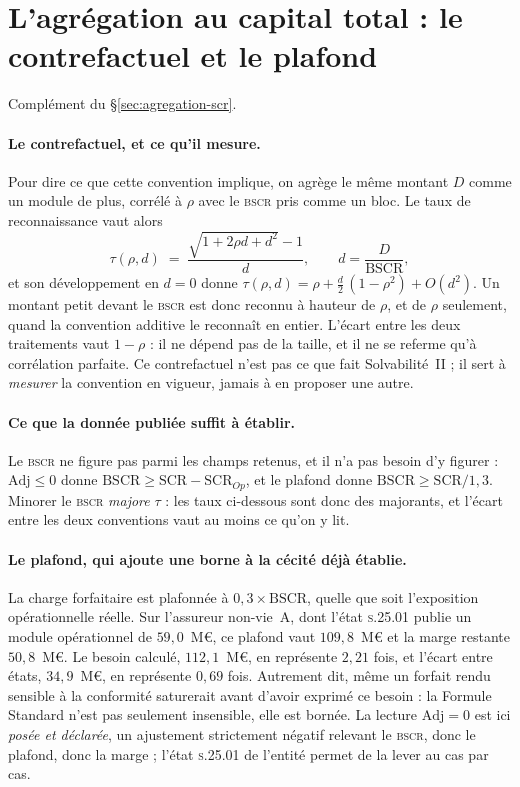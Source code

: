 \section{L'agrégation au capital total : le contrefactuel et le plafond}
\label{sec:ann-agregation}


Complément du \S\ref{sec:agregation-scr}.

\paragraph{Le contrefactuel, et ce qu'il mesure.} Pour dire ce que cette convention implique, on
agrège le même montant $D$ comme un module de plus, corrélé à $\rho$ avec le \textsc{bscr} pris
comme un bloc. Le taux de reconnaissance vaut alors
\[
  \tau(\rho, d) \;=\; \frac{\sqrt{1 + 2\rho d + d^{2}} - 1}{d},
  \qquad d = \frac{D}{\mathrm{BSCR}},
\]
et son développement en $d = 0$ donne $\tau(\rho, d) = \rho + \tfrac{d}{2}\,(1 - \rho^{2}) +
O(d^{2})$. Un montant petit devant le \textsc{bscr} est donc reconnu à hauteur de $\rho$,
et de $\rho$ seulement, quand la convention additive le reconnaît en entier. L'écart entre les
deux traitements vaut $1 - \rho$ : il ne dépend pas de la taille, et il ne se referme qu'à
corrélation parfaite. Ce contrefactuel n'est pas ce que fait Solvabilité~II ; il sert à
\emph{mesurer} la convention en vigueur, jamais à en proposer une autre.

\paragraph{Ce que la donnée publiée suffit à établir.} Le \textsc{bscr} ne figure pas parmi les
champs retenus, et il n'a pas besoin d'y figurer : $\mathrm{Adj} \le 0$ donne
$\mathrm{BSCR} \ge \mathrm{SCR} - \mathrm{SCR}_{Op}$, et le plafond donne
$\mathrm{BSCR} \ge \mathrm{SCR}/1{,}3$. Minorer le \textsc{bscr} \emph{majore} $\tau$ : les taux
ci-dessous sont donc des majorants, et l'écart entre les deux conventions vaut au moins ce qu'on
y lit.


\paragraph{Le plafond, qui ajoute une borne à la cécité déjà établie.} La charge forfaitaire est
plafonnée à $0{,}3 \times \mathrm{BSCR}$, quelle que soit l'exposition opérationnelle réelle. Sur
l'assureur non-vie~A, dont l'état \textsc{s.25.01} publie un module opérationnel de
$59{,}0$~M\euro, ce plafond vaut $109{,}8$~M\euro{} et la marge restante $50{,}8$~M\euro. Le
besoin calculé, $112{,}1$~M\euro, en représente $2{,}21$ fois, et l'écart entre états,
$34{,}9$~M\euro, en représente $0{,}69$ fois. Autrement dit, même un forfait rendu
sensible à la conformité saturerait avant d'avoir exprimé ce besoin : la Formule Standard n'est
pas seulement insensible, elle est bornée. La lecture $\mathrm{Adj} = 0$ est ici \emph{posée et
déclarée}, un ajustement strictement négatif relevant le \textsc{bscr}, donc le plafond, donc la
marge ; l'état \textsc{s.25.01} de l'entité permet de la lever au cas par cas.

